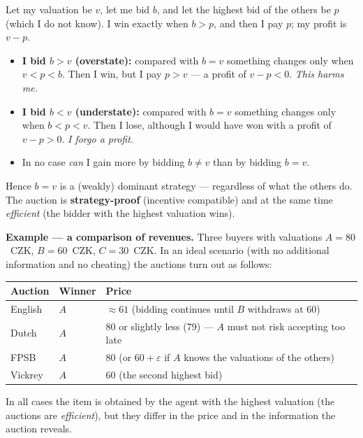 \documentclass[11pt,a4paper]{article}
\theoremstyle{definition}
\begin{document}
\begin{defbox}
Let my valuation be $v$, let me bid $b$, and let the highest bid of the others be $p$ (which I do not
know). I win exactly when $b > p$, and then I pay $p$; my profit is $v - p$.
\begin{itemize}
\item \textbf{I bid $b > v$ (overstate):} compared with $b=v$ something changes only when
  $v < p < b$. Then I win, but I pay $p > v$ --- a profit of $v - p < 0$. \emph{This harms me.}
\item \textbf{I bid $b < v$ (understate):} compared with $b=v$ something changes only when
  $b < p < v$. Then I lose, although I would have won with a profit of $v - p > 0$. \emph{I forgo a
  profit.}
\item In no case \emph{can} I gain more by bidding $b \ne v$ than by bidding $b = v$.
\end{itemize}
Hence $b = v$ is a (weakly) dominant strategy --- regardless of what the others do.
The auction is \textbf{strategy-proof} (incentive compatible)
and at the same time \emph{efficient} (the bidder with the highest valuation wins).
\end{defbox}

\medskip
\noindent\textbf{Example --- a comparison of revenues.} Three buyers with valuations
$A = 80$~CZK, $B = 60$~CZK, $C = 30$~CZK. In an ideal scenario (with no additional information and no
cheating) the auctions turn out as follows:
\begin{center}\small
\begin{tabular}{lll}
\toprule
\textbf{Auction} & \textbf{Winner} & \textbf{Price} \\
\midrule
English & $A$ & $\approx 61$ (bidding continues until $B$ withdraws at 60) \\
Dutch & $A$ & $80$ or slightly less (79) --- $A$ must not risk accepting too late \\
FPSB & $A$ & $80$ (or $60+\varepsilon$ if $A$ knows the valuations of the others) \\
Vickrey & $A$ & $60$ (the second highest bid) \\
\bottomrule
\end{tabular}
\end{center}
In all cases the item is obtained by the agent with the highest valuation (the auctions are
\emph{efficient}), but they differ in the price and in the information the auction reveals.
\end{document}
